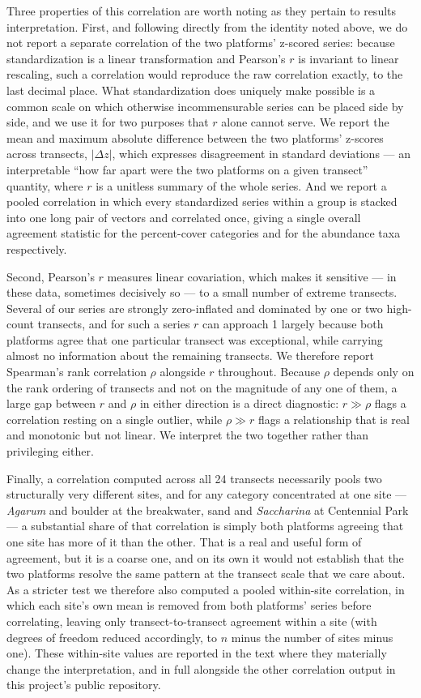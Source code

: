 \documentclass[11pt]{article}
\begin{document}
Three properties of this correlation are worth noting as they pertain to 
results interpretation.
First, and following directly from the identity noted above, we do not report
a separate correlation of the two platforms' z-scored series: because
standardization is a linear transformation and Pearson's $r$ is invariant to
linear rescaling, such a correlation would reproduce the raw correlation
exactly, to the last decimal place.
What standardization does uniquely make possible is a common scale on which
otherwise incommensurable series can be placed side by side, and we use it for
two purposes that $r$ alone cannot serve.
We report the mean and maximum absolute difference between the two platforms'
z-scores across transects, $|\Delta z|$, which expresses disagreement in
standard deviations --- an interpretable ``how far apart were the two
platforms on a given transect'' quantity, where $r$ is a unitless summary of
the whole series.
And we report a pooled correlation in which every standardized series within a
group is stacked into one long pair of vectors and correlated once, giving a
single overall agreement statistic for the percent-cover categories and for
the abundance taxa respectively.

Second, Pearson's $r$ measures linear covariation, which makes it
sensitive --- in these data, sometimes decisively so --- to a small number of
extreme transects.
Several of our series are strongly zero-inflated and dominated by one or two
high-count transects, and for such a series $r$ can approach 1 largely because
both platforms agree that one particular transect was exceptional, while
carrying almost no information about the remaining transects.
We therefore report Spearman's rank correlation $\rho$ alongside $r$
throughout.
Because $\rho$ depends only on the rank ordering of transects and not on the
magnitude of any one of them, a large gap between $r$ and $\rho$ in either
direction is a direct diagnostic: $r \gg \rho$ flags a correlation resting on
a single outlier, while $\rho \gg r$ flags a relationship that is real and
monotonic but not linear.
We interpret the two together rather than privileging either.

Finally, a correlation computed across all 24 transects necessarily pools two
structurally very different sites, and for any category concentrated at one
site --- \textit{Agarum} and boulder at the breakwater, sand and
\textit{Saccharina} at Centennial Park --- a substantial share of that
correlation is simply both platforms agreeing that one site has more of it
than the other.
That is a real and useful form of agreement, but it is a coarse one, and on
its own it would not establish that the two platforms resolve the same pattern
at the transect scale that we care about.
As a stricter test we therefore also computed a pooled within-site
correlation, in which each site's own mean is removed from both platforms'
series before correlating, leaving only transect-to-transect agreement within
a site (with degrees of freedom reduced accordingly, to $n$ minus the number
of sites minus one).
These within-site values are reported in the text where they materially change
the interpretation, and in full alongside the other correlation output in this
project's public repository.
\end{document}

